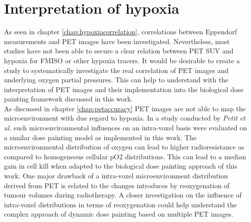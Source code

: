 \section{Interpretation of hypoxia}
As seen in chapter \ref{chap:hypoxiacorrelation}, correlations between Eppendorf measurements and PET images have been investigated. Nevertheless, most studies have not been able to secure a clear relation between PET SUV and hypoxia for FMISO or other hypoxia tracers. It would be desirable to create a study to systematically investigate the real correlation of PET images and underlying oxygen partial pressures. This can help to understand with the interpretation of PET images and their implementation into the biological dose painting framework discussed in this work.\\As discussed in chapter \ref{chap:petaccuracy} PET images are not able to map the microenvironment with due regard to hypoxia. In a study conducted by \textit{Petit et al.}\cite{pmid19293465} such microenvironmental influences on an intra-voxel basis were evaluated on a similar dose painting model as implemented in this work. The microenvironmental distribution of oxygen can lead to higher radioresistance as compared to homogeneous cellular pO2 distributions. This can lead to a median gain in cell kill when adapted to the biological dose painting approach of this work. One major drawback of a intra-voxel microenvironment distribution derived from PET is related to the changes introduces by reoxygenation of tumour volumes during radiotherapy. A closer investigation on the influence of intra-voxel distributions in terms of reoxygenation could help understand the complex approach of dynamic dose painting based on multiple PET images.
